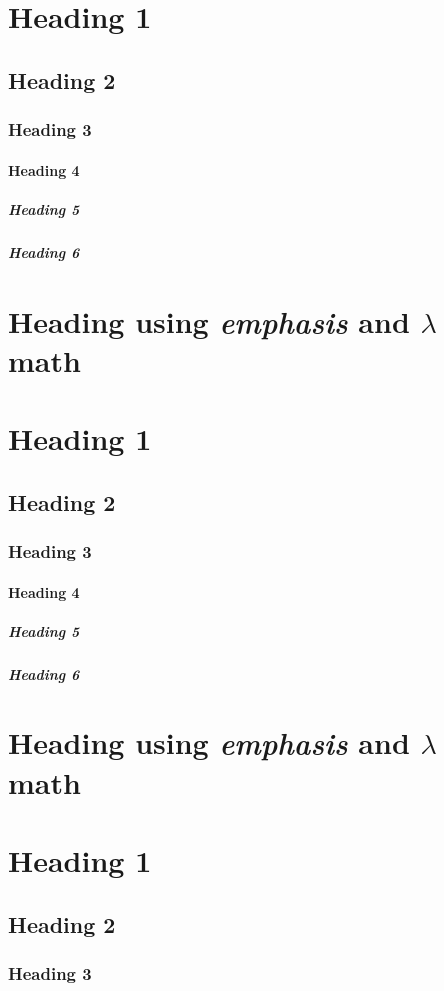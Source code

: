\section{Heading 1}
\subsection{Heading 2}
\subsubsection{Heading 3}
\paragraph{Heading 4}
\subparagraph{Heading 5}
\subparagraph{Heading 6}

\section{Heading using \emph{emphasis} and $\lambda$ math}
\section{Heading 1}
\subsection{Heading 2}
\subsubsection{Heading 3}
\paragraph{Heading 4}
\subparagraph{Heading 5}
\subparagraph{Heading 6}

\section{Heading using \emph{emphasis} and $\lambda$ math}
\section{Heading 1}
\subsection{Heading 2}
\subsubsection{Heading 3}
